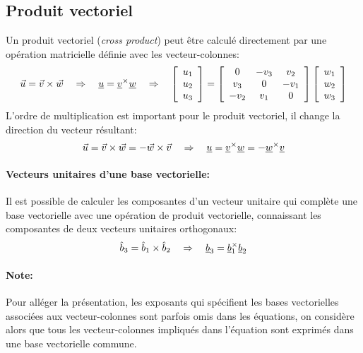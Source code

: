 \subsection{Produit vectoriel}
%
Un produit vectoriel (\textit{cross product}) peut être calculé directement par une opération matricielle définie avec les vecteur-colonnes:
\begin{equation}
\vec{u} = \vec{v} \times \vec{w} \quad \Rightarrow \quad  \underline{u} = \underline{v}^{\times}\underline{w} \quad \Rightarrow \quad 
 \left[ \begin{array}{c} u_1 \\ u_2 \\ u_3  \end{array} \right] = 
\left[ \begin{array}{c c c}
	0 & -v_3 & v_2  \\ v_3 & 0 & -v_1 \\ -v_2 & v_1 & 0
\end{array}  \right]
 \left[ \begin{array}{c} w_1 \\ w_2 \\ w_3  \end{array} \right]
\end{equation} 
L'ordre de multiplication est important pour le produit vectoriel, il change la direction du vecteur résultant:
\begin{equation}
\vec{u} = \vec{v} \times \vec{w} =  -\vec{w} \times \vec{v} \quad \Rightarrow \quad  \underline{u} = \underline{v}^{\times}\underline{w} = - \underline{w}^{\times}\underline{v}
\end{equation} 

\paragraph{Vecteurs unitaires d'une base vectorielle:}
Il est possible de calculer les composantes d'un vecteur unitaire qui complète une base vectorielle avec une opération de produit vectorielle, connaissant les composantes de deux vecteurs unitaires orthogonaux: 
\begin{equation}
\hat{b}_3 = \hat{b}_1 \times \hat{b}_2  \quad \Rightarrow \quad   \underline{b}_3 = \underline{b}_1^{\times}\underline{b}_2
\end{equation} 

\paragraph{Note:}
Pour alléger la présentation, les exposants qui spécifient les bases vectorielles associées aux vecteur-colonnes sont parfois omis dans les équations, on considère alors que tous les vecteur-colonnes impliqués dans l'équation sont exprimés dans une base vectorielle commune.


